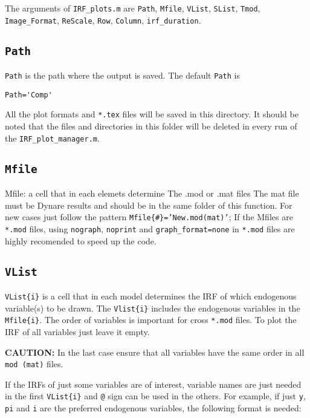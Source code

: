 \documentclass[11pt,a4paper]{article}
\begin{document}
The arguments of \texttt{IRF\_plots.m} are \texttt{Path}, \texttt{Mfile}, \texttt{VList}, \texttt{SList}, \texttt{Tmod}, \texttt{Image_Format}, \texttt{ReScale}, \texttt{Row},  \texttt{Column}, \texttt{irf\_duration}.

\subsection{\texttt{Path}}

\texttt{Path} is the path where the output is saved. The default \texttt{Path} is 

\begin{lstlisting} 
Path='Comp'
\end{lstlisting}

All the plot formats and \texttt{*.tex} files  will be saved in this directory. It should be noted that the files and directories in this folder will be deleted in every run of the \texttt{IRF\_plot\_manager.m}.

\subsection{\texttt{Mfile}}
Mfile: a cell that in each elemets determine The .mod or .mat files
The mat file must be Dynare results and should be
in the same folder of this function.
For new cases just follow the pattern \texttt{Mfile\{\#\}='New.mod(mat)'};
If the Mfiles are \texttt{*.mod} files, using \texttt{nograph}, \texttt{noprint} and 
\texttt{graph_format=none} in \texttt{*.mod} files are highly recomended to
speed up the code.
\subsection{\texttt{VList}}
\texttt{VList\{i\}} is a cell that in each model determines the IRF of which endogenous variable(s) to be drawn. The \texttt{Vlist\{i\}} includes the endogenous variables in the \texttt{Mfile\{i\}}. The order of variables is important for cross \texttt{*.mod} files. To plot the IRF of all variables just leave it empty.

{\bf CAUTION:} In the last case ensure that all variables have the same order 
in all \texttt{mod (mat)} files. 

If the IRFs of just some variables are of interest, variable names are just needed in the first \texttt{VList\{i\}} and \texttt{@} sign can be 
used in the others. For example, if just \texttt{y}, \texttt{pi} and \texttt{i} are the preferred 
endogenous variables, the following format is needed:
\end{document}
